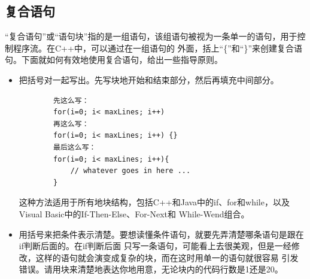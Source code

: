 \documentclass{article}
\begin{document}
\subsection{复合语句}
“复合语句”或“语句块”指的是一组语句，该组语句被视为一条单一的语句，用于控制程序流。在C++中，可以通过在一组语句的
外面，括上“\{”和“\}”来创建复合语句。下面就如何有效地使用复合语句，给出一些指导原则。
\begin{itemize}
    \item 把括号对一起写出。先写块地开始和结束部分，然后再填充中间部分。
    \begin{lstlisting}
        先这么写：
        for(i=0; i< maxLines; i++)
        再这么写：
        for(i=0; i< maxLines; i++) {}
        最后这么写：
        for(i=0; i< maxLines; i++){
            // whatever goes in here ...
        }
    \end{lstlisting}
    这种方法适用于所有地块结构，包括C++和Java中的if、for和while，以及Visual Basic中的If-Then-Else、For-Next和
    While-Wend组合。
    \item 用括号来把条件表示清楚。要想读懂条件语句，就要先弄清楚哪条语句是跟在if判断后面的。在if判断后面
    只写一条语句，可能看上去很美观，但是一经修改，这样的语句就会演变成复杂的块，而在这时用单一的语句就很容易
    引发错误。请用块来清楚地表达你地用意，无论块内的代码行数是1还是20。
\end{itemize}
\end{document}
